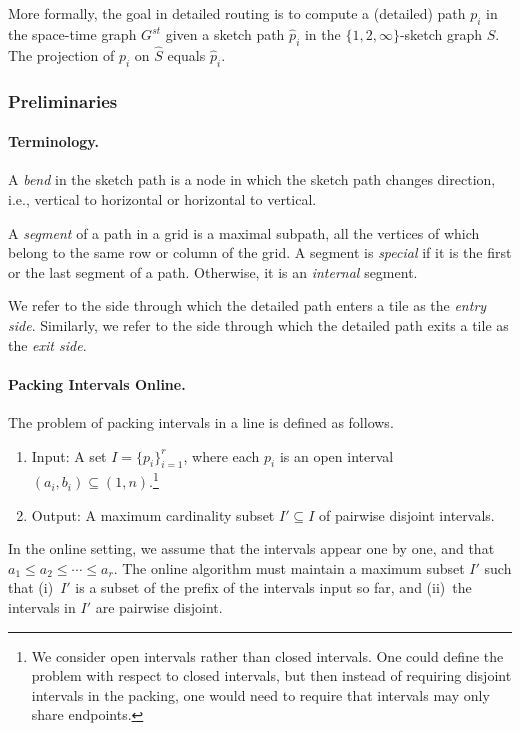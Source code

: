 \documentclass[11pt]{article}
\newenvironment{proof sketch}[1]{\noindent {\emph{Proof sketch of #1:}}}{\hfill \qed}
\begin{document}
More formally, the goal in detailed routing is to compute a (detailed) path $p_i$ in
the space-time graph $G^{st}$ given a sketch path $\hat p_i$ in the $\{1,2,\infty\}$-sketch graph $\hat S$.
The projection of $p_i$ on
$\hat S$ equals $\hat p_i$.


\subsubsection{Preliminaries}

\paragraph{Terminology.}
A \emph{bend} in the sketch path is a node in which the sketch path changes direction, i.e., vertical to horizontal or horizontal to vertical.

A \emph{segment} of a path in a grid is a maximal subpath, all the vertices of which belong to the same row or column of the grid.
A segment is \emph{special} if it is the first or the last segment of a path. Otherwise, it is an \emph{internal} segment.

We refer to the side through which the detailed path enters a tile as the \emph{entry side}.
Similarly, we refer to the side through which the detailed path exits a tile as the \emph{exit side}.

\paragraph{Packing Intervals Online.}\label{sec:intervalp}
The problem of packing intervals in a line is defined as follows.
  \begin{enumerate}
  \item Input: A set $I=\{p_i\}_{i=1}^r$, where each $p_i$ is an open interval
    $(a_i,b_i) \subseteq (1,n)$.\footnote{We consider open intervals rather than
      closed intervals. One could define the problem with respect to closed
      intervals, but then instead of requiring disjoint intervals in the packing,
      one would need to require that intervals may only share endpoints.}
          \item Output: A maximum cardinality subset $I' \subseteq I$ of pairwise
            disjoint intervals.
    \end{enumerate}
    In the online setting, we assume that the
    intervals appear one by one, and that $a_1\leq a_2\leq \cdots \leq a_r$. The online algorithm must maintain a maximum subset $I'$ such that
    (i)~$I'$ is a subset of the prefix of the intervals input so far, and (ii)~the
    intervals in $I'$ are pairwise disjoint.
\end{document}
